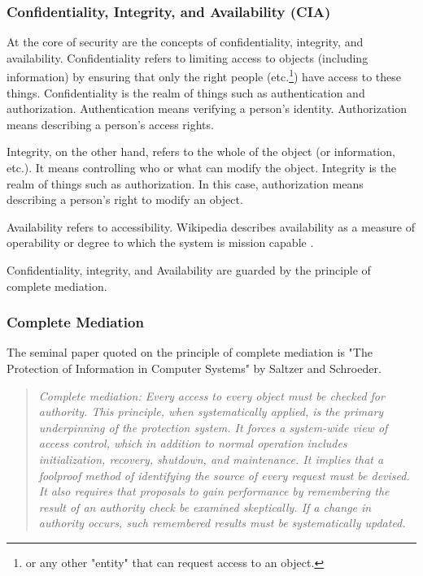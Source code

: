 \documentclass[../../main/main.tex]{subfiles}
\begin{document}
\subsubsection{Confidentiality, Integrity, and Availability (CIA) }\label{sssect:ssmts}
At the core of security are the concepts of confidentiality, integrity, and availability.  Confidentiality refers to limiting access to objects (including information) by ensuring that only the right people (etc.\footnote{or any other "entity" that can request access to an object.}) have access to these things.  Confidentiality is the realm of things such as authentication and authorization.  Authentication means verifying a person's identity.  Authorization means describing a person's access rights. 

Integrity, on the other hand, refers to the whole of the object (or information, etc.).  It means controlling who or what can modify the object.   Integrity is the realm of things such as authorization.  In this case, authorization means describing a person's right to modify an object.  

Availability refers to accessibility.  Wikipedia describes availability as a measure of operability or degree to which the system is mission capable \cite {availability}. 

Confidentiality, integrity, and Availability are guarded by the principle of complete mediation.  


\subsubsection{Complete Mediation}\label{sssec:strommediate}
The seminal paper quoted on the principle of complete mediation is "The Protection of Information in Computer Systems" by Saltzer and Schroeder.  
\begin{quote}
\textit{
Complete mediation: Every access to every object must be checked for authority. This principle, when systematically applied, is the primary underpinning of the protection system. It forces a system-wide view of access control, which in addition to normal operation includes initialization, recovery, shutdown, and maintenance. It implies that a foolproof method of identifying the source of every request must be devised. It also requires that proposals to gain performance by remembering the result of an authority check be examined skeptically. If a change in authority occurs, such remembered results must be systematically updated.} \cite{saltzer}
\end{quote}
\end{document}
